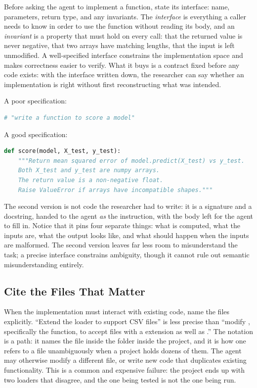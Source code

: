 Before asking the agent to implement a function, state its interface: name, parameters, return type, and any invariants.
The \emph{interface} is everything a caller needs to know in order to use the function without reading its body, and an \emph{invariant} is a property that must hold on every call: that the returned value is never negative, that two arrays have matching lengths, that the input is left unmodified.
A well-specified interface constrains the implementation space and makes correctness easier to verify.
What it buys is a contract fixed before any code exists: with the interface written down, the researcher can say whether an implementation is right without first reconstructing what was intended.

\begin{example}
A poor specification:
\begin{lstlisting}[language=python]
# "write a function to score a model"
\end{lstlisting}
A good specification:
\begin{lstlisting}[language=python]
def score(model, X_test, y_test):
    """Return mean squared error of model.predict(X_test) vs y_test.
    Both X_test and y_test are numpy arrays.
    The return value is a non-negative float.
    Raise ValueError if arrays have incompatible shapes."""
\end{lstlisting}
The second version is not code the researcher had to write: it is a signature and a docstring, handed to the agent \emph{as} the instruction, with the body left for the agent to fill in.
Notice that it pins four separate things: what is computed, what the inputs are, what the output looks like, and what should happen when the inputs are malformed.
The second version leaves far less room to misunderstand the task; a precise interface constrains ambiguity, though it cannot rule out semantic misunderstanding entirely.
\end{example}

\subsection{Cite the Files That Matter}

When the implementation must interact with existing code, name the files explicitly.
``Extend the loader to support CSV files'' is less precise than ``modify , specifically the  function, to accept files with a  extension as well as .''
The notation  is a path: it names the file  inside the folder  inside the project, and it is how one refers to a file unambiguously when a project holds dozens of them.
The agent may otherwise modify a different file, or write new code that duplicates existing functionality.
This is a common and expensive failure: the project ends up with two loaders that disagree, and the one being tested is not the one being run.

